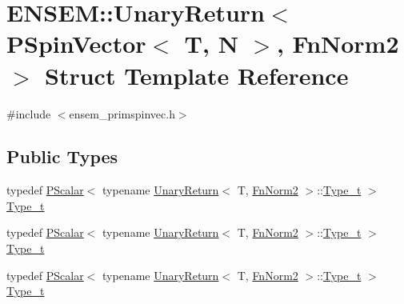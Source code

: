 \hypertarget{structENSEM_1_1UnaryReturn_3_01PSpinVector_3_01T_00_01N_01_4_00_01FnNorm2_01_4}{}\section{E\+N\+S\+EM\+:\+:Unary\+Return$<$ P\+Spin\+Vector$<$ T, N $>$, Fn\+Norm2 $>$ Struct Template Reference}
\label{structENSEM_1_1UnaryReturn_3_01PSpinVector_3_01T_00_01N_01_4_00_01FnNorm2_01_4}


{\ttfamily \#include $<$ensem\+\_\+primspinvec.\+h$>$}

\subsection*{Public Types}
\begin{DoxyCompactItemize}
\item 
typedef \mbox{\hyperlink{classENSEM_1_1PScalar}{P\+Scalar}}$<$ typename \mbox{\hyperlink{structENSEM_1_1UnaryReturn}{Unary\+Return}}$<$ T, \mbox{\hyperlink{structENSEM_1_1FnNorm2}{Fn\+Norm2}} $>$\+::\mbox{\hyperlink{structENSEM_1_1UnaryReturn_3_01PSpinVector_3_01T_00_01N_01_4_00_01FnNorm2_01_4_ac4b3c3fbd1e791cd12922af9afc970f9}{Type\+\_\+t}} $>$ \mbox{\hyperlink{structENSEM_1_1UnaryReturn_3_01PSpinVector_3_01T_00_01N_01_4_00_01FnNorm2_01_4_ac4b3c3fbd1e791cd12922af9afc970f9}{Type\+\_\+t}}
\item 
typedef \mbox{\hyperlink{classENSEM_1_1PScalar}{P\+Scalar}}$<$ typename \mbox{\hyperlink{structENSEM_1_1UnaryReturn}{Unary\+Return}}$<$ T, \mbox{\hyperlink{structENSEM_1_1FnNorm2}{Fn\+Norm2}} $>$\+::\mbox{\hyperlink{structENSEM_1_1UnaryReturn_3_01PSpinVector_3_01T_00_01N_01_4_00_01FnNorm2_01_4_ac4b3c3fbd1e791cd12922af9afc970f9}{Type\+\_\+t}} $>$ \mbox{\hyperlink{structENSEM_1_1UnaryReturn_3_01PSpinVector_3_01T_00_01N_01_4_00_01FnNorm2_01_4_ac4b3c3fbd1e791cd12922af9afc970f9}{Type\+\_\+t}}
\item 
typedef \mbox{\hyperlink{classENSEM_1_1PScalar}{P\+Scalar}}$<$ typename \mbox{\hyperlink{structENSEM_1_1UnaryReturn}{Unary\+Return}}$<$ T, \mbox{\hyperlink{structENSEM_1_1FnNorm2}{Fn\+Norm2}} $>$\+::\mbox{\hyperlink{structENSEM_1_1UnaryReturn_3_01PSpinVector_3_01T_00_01N_01_4_00_01FnNorm2_01_4_ac4b3c3fbd1e791cd12922af9afc970f9}{Type\+\_\+t}} $>$ \mbox{\hyperlink{structENSEM_1_1UnaryReturn_3_01PSpinVector_3_01T_00_01N_01_4_00_01FnNorm2_01_4_ac4b3c3fbd1e791cd12922af9afc970f9}{Type\+\_\+t}}
\end{DoxyCompactItemize}


